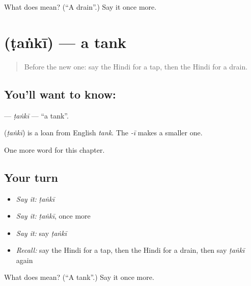 \begin{tcolorbox}[breakable,colback=teal!4,colframe=teal!35!black,title={Before you move on}]
What does  mean? (\textquotedblleft{}A drain\textquotedblright{}.) Say it once more.
\end{tcolorbox}
\section[\texorpdfstring{\hi{टंकी} (ṭaṅkī)}{टंकी (ṭaṅkī)}]{ (ṭaṅkī) — a tank}

\label{lesson:HI-C267-tanki}



\begin{quote}
Before the new one: say the Hindi for a tap, then the Hindi for a drain.
\end{quote}

\subsection*{You'll want to know: }
\textbf{} — \emph{ṭaṅkī} — \textquotedblleft{}a tank\textquotedblright{}.

\begin{cousinweb}
\textbf{} (\emph{ṭaṅkī}) is a loan from English \emph{tank}. The \emph{-ī} makes a smaller one.
\end{cousinweb}

\begin{grammarlens}[title={What you've built}]
One more word for this chapter.
\end{grammarlens}

\subsection*{Your turn}
\begin{itemize}
\raggedright
  \item \emph{Say it:} \emph{ṭaṅkī}
  \item \emph{Say it:} \emph{ṭaṅkī}, once more
  \item \emph{Say it:} say \emph{ṭaṅkī}
  \item \emph{Recall:} say the Hindi for a tap, then the Hindi for a drain, then say \emph{ṭaṅkī} again
\end{itemize}

\begin{tcolorbox}[breakable,colback=teal!4,colframe=teal!35!black,title={Before you move on}]
What does  mean? (\textquotedblleft{}A tank\textquotedblright{}.) Say it once more.
\end{tcolorbox}
